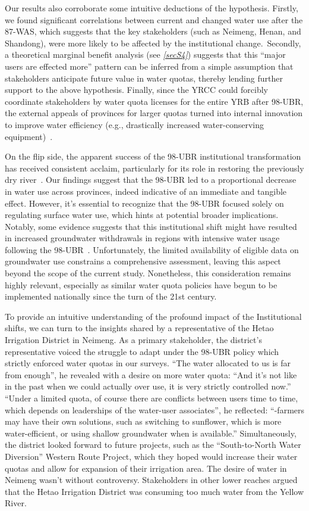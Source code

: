 \documentclass[preprint, 12pt]{elsarticle}
\begin{document}
Our results also corroborate some intuitive deductions of the hypothesis.
Firstly, we found significant correlations between current and changed water use after the 87-WAS, which suggests that the key stakeholders (such as Neimeng, Henan, and Shandong), were more likely to be affected by the institutional change.\
Secondly, a theoretical marginal benefit analysis (see \textit{\ref{secS4}}) suggests that this ``major users are effected more'' pattern can be inferred from a simple assumption that stakeholders anticipate future value in water quotas, thereby lending further support to the above hypothesis.
Finally, since the YRCC could forcibly coordinate stakeholders by water quota licenses for the entire YRB after 98-UBR, the external appeals of provinces for larger quotas turned into internal innovation to improve water efficiency (e.g., drastically increased water-conserving equipment)~\cite{krieger1955, ostrom1990}.

On the flip side, the apparent success of the 98-UBR institutional transformation has received consistent acclaim, particularly for its role in restoring the previously dry river~\cite{wang2019e, wang2019d}.
Our findings suggest that the 98-UBR led to a proportional decrease in water use across provinces, indeed indicative of an immediate and tangible effect.
However, it's essential to recognize that the 98-UBR focused solely on regulating surface water use, which hints at potential broader implications.
Notably, some evidence suggests that this institutional shift might have resulted in increased groundwater withdrawals in regions with intensive water usage following the 98-UBR~\cite{sun2022b}.
Unfortunately, the limited availability of eligible data on groundwater use constrains a comprehensive assessment, leaving this aspect beyond the scope of the current study.
Nonetheless, this consideration remains highly relevant, especially as similar water quota policies have begun to be implemented nationally since the turn of the 21st century.

To provide an intuitive understanding of the profound impact of the Institutional shifts, we can turn to the insights shared by a representative of the Hetao Irrigation District in Neimeng.
As a primary stakeholder, the district's representative voiced the struggle to adapt under the 98-UBR policy which strictly enforced water quotas in our surveys.
``The water allocated to us is far from enough'', he revealed with a desire on more water quota: ``And it's not like in the past when we could actually over use, it is very strictly controlled now.''
``Under a limited quota, of course there are conflicts between users time to time, which depends on leaderships of the water-user associates'', he reflected: ``-farmers may have their own solutions, such as switching to sunflower, which is more water-efficient, or using shallow groundwater when is available.''
Simultaneously, the district looked forward to future projects, such as the ``South-to-North Water Diversion'' Western Route Project, which they hoped would increase their water quotas and allow for expansion of their irrigation area.
The desire of water in Neimeng wasn't without controversy. Stakeholders in other lower reaches argued that the Hetao Irrigation District was consuming too much water from the Yellow River.
\end{document}
